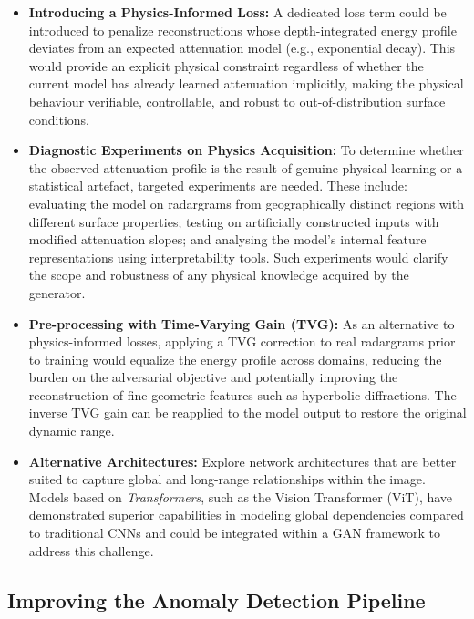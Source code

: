 \begin{itemize}
    \item \textbf{Introducing a Physics-Informed Loss:} A dedicated loss term could be introduced to penalize reconstructions whose depth-integrated energy profile deviates from an expected attenuation model (e.g., exponential decay). This would provide an explicit physical constraint regardless of whether the current model has already learned attenuation implicitly, making the physical behaviour verifiable, controllable, and robust to out-of-distribution surface conditions.
    \item \textbf{Diagnostic Experiments on Physics Acquisition:} To determine whether the observed attenuation profile is the result of genuine physical learning or a statistical artefact, targeted experiments are needed. These include: evaluating the model on radargrams from geographically distinct regions with different surface properties; testing on artificially constructed inputs with modified attenuation slopes; and analysing the model's internal feature representations using interpretability tools. Such experiments would clarify the scope and robustness of any physical knowledge acquired by the generator.
    \item \textbf{Pre-processing with Time-Varying Gain (TVG):} As an alternative to physics-informed losses, applying a TVG correction to real radargrams prior to training would equalize the energy profile across domains, reducing the burden on the adversarial objective and potentially improving the reconstruction of fine geometric features such as hyperbolic diffractions. The inverse TVG gain can be reapplied to the model output to restore the original dynamic range.
    \item \textbf{Alternative Architectures:} Explore network architectures that are better suited to capture global and long-range relationships within the image. Models based on \textit{Transformers}, such as the Vision Transformer (ViT), have demonstrated superior capabilities in modeling global dependencies compared to traditional CNNs and could be integrated within a GAN framework to address this challenge.
\end{itemize}

\subsection{Improving the Anomaly Detection Pipeline}

